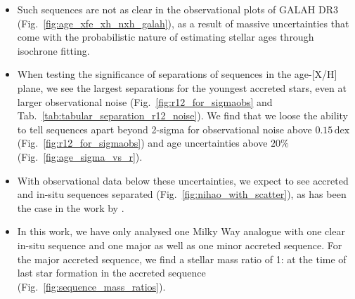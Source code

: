 \documentclass[fleqn,usenatbib]{mnras}
\begin{document}
\begin{itemize}
    \item Such sequences are not as clear in the observational plots of GALAH DR3 (Fig.~\ref{fig:age_xfe_xh_nxh_galah}), as a result of massive uncertainties that come with the probabilistic nature of estimating stellar ages through isochrone fitting.
    \item When testing the significance of separations of sequences in the age-[X/H] plane, we see the largest separations for the youngest accreted stars, even at larger observational noise (Fig.~\ref{fig:r12_for_sigmaobs} and Tab.~\ref{tab:tabular_separation_r12_noise}). We find that we loose the ability to tell sequences apart beyond 2-sigma for observational noise above $0.15\,\mathrm{dex}$ (Fig.~\ref{fig:r12_for_sigmaobs}) and age uncertainties above $20\%$ (Fig.~\ref{fig:age_sigma_vs_r}).
    \item With observational data below these uncertainties, we expect to see accreted and in-situ sequences separated (Fig.~\ref{fig:nihao_with_scatter}), as has been the case in the work by \citet{Xiang2022}.
    \item In this work, we have only analysed one Milky Way analogue with one clear in-situ sequence and one major as well as one minor accreted sequence. For the major accreted sequence, we find a stellar mass ratio of 1: at the time of last star formation in the accreted sequence (Fig.~\ref{fig:sequence_mass_ratios}).
\end{itemize}
\end{document}

